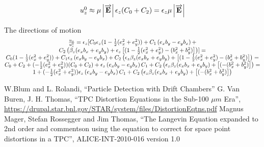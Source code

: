 \documentclass[12pt]{article} %
\begin{document}
\begin{equation}  %
\begin{matrix}
u_{z}^{0} \approx
\mu \left| \overrightarrow{ \mathbf{E} }\right| 
  \epsilon_{z} ( C_{0} + C_{2} )
= \epsilon_{z} \mu \left| \overrightarrow{ \mathbf{E} }\right| 
\cr
\end{matrix}
\end{equation}


The directions of motion 
\begin{equation}
\begin{matrix}
\frac{u_{z}}{u_{z}^{0}} = \epsilon_{z} [
 C_{0} \epsilon_{z}  (1 - \frac{1}{2}( e_{x}^2 + e_{y}^2)) +
 C_{1} \left(e_{x} b_{y} - e_{y} b_{x}\right) + \cr
 C_{2} \left( \beta_{z} (e_{x} b_{x} + e_{y} b_{y}) + \epsilon_{z} \left[ (1  - \frac{1}{2}(e_{x}^2 + e_{y}^2) - ( b_{x}^2 + b_{y}^2) \right] \right)
] = \cr
 C_{0}  (1 - \frac{1}{2}( e_{x}^2 + e_{y}^2)) +
 C_{1} \epsilon_{z} \left(e_{x} b_{y} - e_{y} b_{x}\right) + 
 C_{2} \left( \epsilon_{z} \beta_{z} (e_{x} b_{x} + e_{y} b_{y}) + \left[ (1  - \frac{1}{2}(e_{x}^2 + e_{y}^2) - ( b_{x}^2 + b_{y}^2) \right] \right)
 = \cr
 C_{0} + C_{2} +
 (- \frac{1}{2}( e_{x}^2 + e_{y}^2)) (C_{0} + C_{2}) +
 \epsilon_{z} \left(e_{x} b_{y} - e_{y} b_{x}\right) C_{1}  + 
 C_{2} \left( \epsilon_{z} \beta_{z} (e_{x} b_{x} + e_{y} b_{y}) + \left[ ( - ( b_{x}^2 + b_{y}^2) \right] \right)
 = \cr
 1 +
 (- \frac{1}{2}( e_{x}^2 + e_{y}^2)) 
 \epsilon_{z} \left(e_{x} b_{y} - e_{y} b_{x}\right) C_{1}  + 
 C_{2} \left( \epsilon_{z} \beta_{z} (e_{x} b_{x} + e_{y} b_{y}) + \left[ ( - ( b_{x}^2 + b_{y}^2) \right] \right)

\end{matrix}
\end{equation}


\begin{thebibliography}{99}
 W.Blum and L. Rolandi, ``Particle Detection with Drift Chambers''
 G. Van Buren, J. H. Thomas, ``TPC Distortion Equations in the Sub-100 $\mu m$ Era'',
\url{https://drupal.star.bnl.gov/STAR/system/files/DistortionEqtns.pdf}
 Magnus Mager, Stefan Rossegger and Jim Thomas, ``The Langevin Equation expanded to 2nd order and commentson using the equation to correct for space point distortions in a TPC'', ALICE-INT-2010-016 version 1.0
\end{thebibliography}
\end{document}
